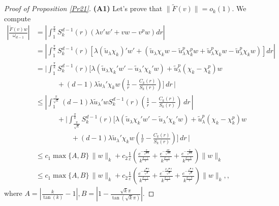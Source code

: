\documentclass[reqno]{amsart}
\numberwithin{equation}{section}
\newenvironment{key words}{\textbf{Keywords}\mbox{  }}{ }
\begin{document}
\begin{proof}[Proof of Proposition \ref{Pr21}]
\textbf{(A1)} Let's prove that $\|\tilde{F}(v)\| = o_{k}(1).$ We compute
 \begin{align*}
 | \frac{\tilde{F}(v)w}{\omega_{d-1}}| &=\left|\int_{1}^{\frac{\pi}{k}}S^{d-1}_{k}(r)(\lambda v'w'+vw-v^{p}w)dr\right|\\
     &=\left|\int_{1}^{\frac{\pi}{k}}S^{d-1}_{k}(r)\left[\lambda (\tilde{u}_\lambda\chi_{k})'w'+(\tilde{u}_\lambda\chi_{k}w-\tilde{u}_\lambda^{p}\chi_{k}^{p}w+\tilde{u}_\lambda^{p}\chi_{k}w-\tilde{u}_\lambda^{p}\chi_{k}w)\right]dr\right|\\
    &= \Bigg| \int_{1}^{\frac{\pi}{k}}S^{d-1}_{k}(r)\Bigg[\lambda (\tilde{u}_\lambda\chi_{k}'w'- \tilde{u}_\lambda'\chi_{k}'w)+\tilde{u}_\lambda^{p}(\chi_{k} -\chi_{k}^{p})w\,  \\
 &\quad \qquad +(d-1)\lambda \tilde{u}_\lambda'\chi_{k}w\left(\frac{1}{r}-\frac{C_{k}(r)}{S_{k}(r)}\right)\Bigg]\, dr \,\Bigg|\\
    &\leq \left|\int_{1}^{\frac{\pi}{\sqrt{k}}}(d-1)\lambda \tilde{u}_\lambda'wS^{d-1}_{k}(r)\left(\frac{1}{r}-\frac{C_{k}(r)}{S_{k}(r)}\right)\, dr\, \right| \\
    &\quad\qquad +\Bigg|\int_{\frac{\pi}{\sqrt{k}}}^{\frac{\pi}{k}}S^{d-1}_{k}(r)\Bigg[\lambda (\tilde{u}_\lambda\chi_{k}'w'- \tilde{u}_\lambda'\chi_{k}'w)+\tilde{u}_\lambda^{p}(\chi_{k}
     -\chi_{k}^{p})w\\ &\quad \qquad \qquad  +(d-1)\lambda \tilde{u}_\lambda'\chi_{k}w\left(\frac{1}{r}-\frac{C_{k}(r)}{S_{k}(r)}\right)\Bigg]\, dr \, \Bigg|\\
    &\leq c_{1}\max\{A,B\}\, \|w\|_{k}+c_{2}\frac{1}{\varepsilon}\left(\frac{ e^{-\frac{\pi}{\sqrt{k\lambda}}}}{k^{\frac{d-1}{4}}}+
    \frac{e^{-\frac{p\pi}{\sqrt{k\lambda}}}}{k^{\frac{d-1}{2}}}
    +\frac{ e^{-\frac{\pi}{\sqrt{k\lambda}}}}{k^{\frac{d-3}{2}}}\right)\|w\|_{k}\\
     &\leq c_{1}\max\{A,B\}\, \|w\|_{k}+c_{2}\frac{1}{\varepsilon}\left(\frac{ e^{-\frac{\sqrt{\varepsilon}\pi}{\sqrt{k}}}}{k^{\frac{d-1}{4}}}+
    \frac{e^{-\frac{p\sqrt{\varepsilon}\pi}{\sqrt{k}}}}{k^{\frac{d-1}{2}}}
    +\frac{ e^{-\frac{\sqrt{\varepsilon}\pi}{\sqrt{k}}}}{k^{\frac{d-3}{2}}}\right)\|w\|_{k},,
\end{align*}
where $A=\left|\frac{k}{\tan(k)}-1\right|,B=\left|1-\frac{\sqrt{k}\pi}{\tan(\sqrt{k}\pi)}\right|.$
\medskip


\end{proof}
\end{document}
